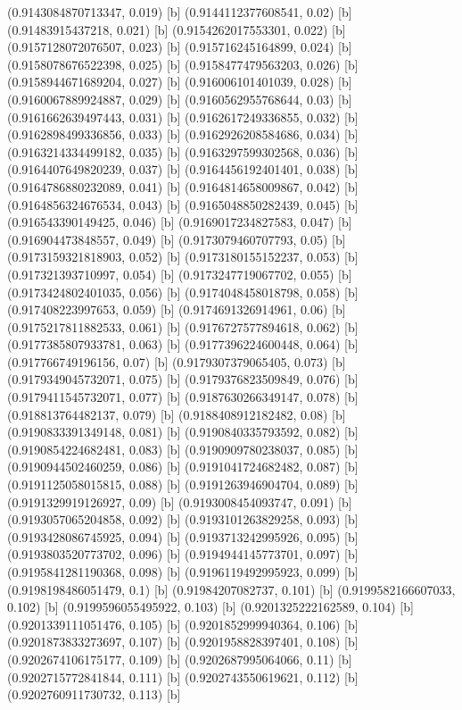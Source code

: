 {{{(0.9143084870713347, 0.019) [b] 
(0.9144112377608541, 0.02) [b] 
(0.91483915437218, 0.021) [b] 
(0.9154262017553301, 0.022) [b] 
(0.9157128072076507, 0.023) [b] 
(0.915716245164899, 0.024) [b] 
(0.9158078676522398, 0.025) [b] 
(0.9158477479563203, 0.026) [b] 
(0.9158944671689204, 0.027) [b] 
(0.916006101401039, 0.028) [b] 
(0.9160067889924887, 0.029) [b] 
(0.9160562955768644, 0.03) [b] 
(0.9161662639497443, 0.031) [b] 
(0.9162617249336855, 0.032) [b] 
(0.9162898499336856, 0.033) [b] 
(0.9162926208584686, 0.034) [b] 
(0.9163214334499182, 0.035) [b] 
(0.9163297599302568, 0.036) [b] 
(0.9164407649820239, 0.037) [b] 
(0.9164456192401401, 0.038) [b] 
(0.9164786880232089, 0.041) [b] 
(0.9164814658009867, 0.042) [b] 
(0.9164856324676534, 0.043) [b] 
(0.9165048850282439, 0.045) [b] 
(0.916543390149425, 0.046) [b] 
(0.9169017234827583, 0.047) [b] 
(0.916904473848557, 0.049) [b] 
(0.9173079460707793, 0.05) [b] 
(0.9173159321818903, 0.052) [b] 
(0.9173180155152237, 0.053) [b] 
(0.917321393710997, 0.054) [b] 
(0.9173247719067702, 0.055) [b] 
(0.9173424802401035, 0.056) [b] 
(0.9174048458018798, 0.058) [b] 
(0.917408223997653, 0.059) [b] 
(0.9174691326914961, 0.06) [b] 
(0.9175217811882533, 0.061) [b] 
(0.9176727577894618, 0.062) [b] 
(0.9177385807933781, 0.063) [b] 
(0.9177396224600448, 0.064) [b] 
(0.917766749196156, 0.07) [b] 
(0.9179307379065405, 0.073) [b] 
(0.9179349045732071, 0.075) [b] 
(0.9179376823509849, 0.076) [b] 
(0.9179411545732071, 0.077) [b] 
(0.9187630266349147, 0.078) [b] 
(0.918813764482137, 0.079) [b] 
(0.9188408912182482, 0.08) [b] 
(0.9190833391349148, 0.081) [b] 
(0.9190840335793592, 0.082) [b] 
(0.9190854224682481, 0.083) [b] 
(0.9190909780238037, 0.085) [b] 
(0.9190944502460259, 0.086) [b] 
(0.9191041724682482, 0.087) [b] 
(0.9191125058015815, 0.088) [b] 
(0.9191263946904704, 0.089) [b] 
(0.9191329919126927, 0.09) [b] 
(0.9193008454093747, 0.091) [b] 
(0.9193057065204858, 0.092) [b] 
(0.9193101263829258, 0.093) [b] 
(0.9193428086745925, 0.094) [b] 
(0.9193713242995926, 0.095) [b] 
(0.9193803520773702, 0.096) [b] 
(0.9194944145773701, 0.097) [b] 
(0.9195841281190368, 0.098) [b] 
(0.9196119492995923, 0.099) [b] 
(0.9198198486051479, 0.1) [b] 
(0.91984207082737, 0.101) [b] 
(0.9199582166607033, 0.102) [b] 
(0.9199596055495922, 0.103) [b] 
(0.9201325222162589, 0.104) [b] 
(0.9201339111051476, 0.105) [b] 
(0.9201852999940364, 0.106) [b] 
(0.9201873833273697, 0.107) [b] 
(0.9201958828397401, 0.108) [b] 
(0.9202674106175177, 0.109) [b] 
(0.9202687995064066, 0.11) [b] 
(0.9202715772841844, 0.111) [b] 
(0.9202743550619621, 0.112) [b] 
(0.9202760911730732, 0.113) [b] 
}}}
